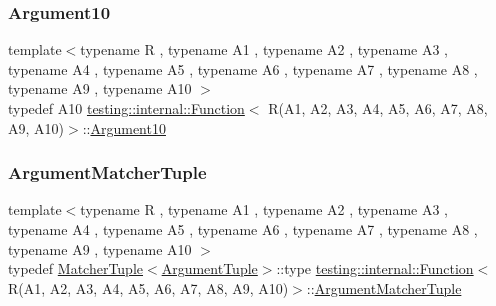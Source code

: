 \subsubsection{\texorpdfstring{Argument10}{Argument10}}
{\footnotesize\ttfamily template$<$typename R , typename A1 , typename A2 , typename A3 , typename A4 , typename A5 , typename A6 , typename A7 , typename A8 , typename A9 , typename A10 $>$ \\
typedef A10 \mbox{\hyperlink{structtesting_1_1internal_1_1_function}{testing\+::internal\+::\+Function}}$<$ R(A1, A2, A3, A4, A5, A6, A7, A8, A9, A10)$>$\+::\mbox{\hyperlink{structtesting_1_1internal_1_1_function_3_01_r_07_a1_00_01_a2_00_01_a3_00_01_a4_00_01_a5_00_01_a6f6ff91550f0557b7708e490e5002cd35_a74022db8f1642276a1a9033da16cc2f5}{Argument10}}}

\mbox{\label{structtesting_1_1internal_1_1_function_3_01_r_07_a1_00_01_a2_00_01_a3_00_01_a4_00_01_a5_00_01_a6f6ff91550f0557b7708e490e5002cd35_ad2418eacffea2e3cc5466c93b1fd7002}} 
\subsubsection{\texorpdfstring{ArgumentMatcherTuple}{ArgumentMatcherTuple}}
{\footnotesize\ttfamily template$<$typename R , typename A1 , typename A2 , typename A3 , typename A4 , typename A5 , typename A6 , typename A7 , typename A8 , typename A9 , typename A10 $>$ \\
typedef \mbox{\hyperlink{structtesting_1_1internal_1_1_matcher_tuple}{Matcher\+Tuple}}$<$\mbox{\hyperlink{structtesting_1_1internal_1_1_function_3_01_r_07_08_4_ad483c3128c470d8cdb55c3ac1c575c11}{Argument\+Tuple}}$>$\+::type \mbox{\hyperlink{structtesting_1_1internal_1_1_function}{testing\+::internal\+::\+Function}}$<$ R(A1, A2, A3, A4, A5, A6, A7, A8, A9, A10)$>$\+::\mbox{\hyperlink{structtesting_1_1internal_1_1_function_3_01_r_07_08_4_a9bec5cf8937e8af99dedab2f40129fab}{Argument\+Matcher\+Tuple}}}

